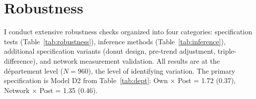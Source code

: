 \documentclass[12pt]{article}
\newcommand{\dept}{d\'{e}partement}
\begin{document}

\section{Robustness}
\label{sec:robustness}

I conduct extensive robustness checks organized into four categories: specification tests (Table~\ref{tab:robustness}), inference methods (Table~\ref{tab:inference}), additional specification variants (donut design, pre-trend adjustment, triple-difference), and network measurement validation. All results are at the \dept{} level ($N = 960$), the level of identifying variation. The primary specification is Model D2 from Table~\ref{tab:dept}: Own $\times$ Post = 1.72 (0.37), Network $\times$ Post = 1.35 (0.46).
\end{document}
